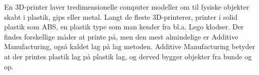 En 3D-printer laver tredimensionelle computer modeller om til fysiske objekter skabt i plastik, gips eller metal. Langt de fleste 3D-printerer, printer i solid plastik som ABS, en plastik type som man kender fra bl.a. Lego klodser. Der findes forskellige måder at printe på, men den mest almindelige er Additive Manufacturing, også kaldet lag på lag metoden. Additive Manufacturing betyder at der printes plastik lag på plastik lag, og derved bygger objekter fra bunde og op. 
